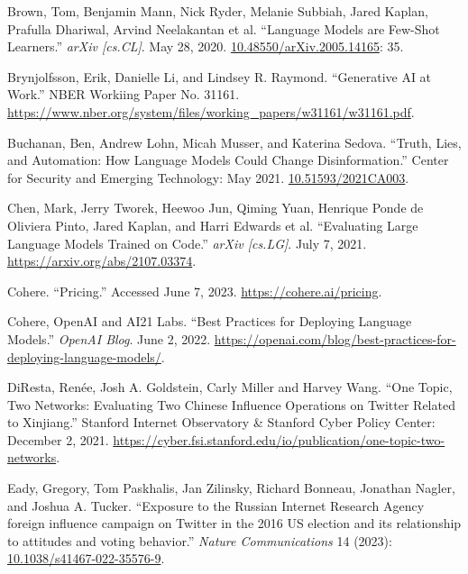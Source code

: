 \documentclass{article}
\begin{document}
\begin{thebibliography}{9}
  Brown, Tom, Benjamin Mann, Nick Ryder, Melanie Subbiah, Jared Kaplan, Prafulla Dhariwal, Arvind Neelakantan et al. ``Language Models are Few-Shot Learners.'' \textit{arXiv [cs.CL]}. May 28, 2020. \href{https://arxiv.org/abs/2005.14165}{10.48550/arXiv.2005.14165}: 35.

  Brynjolfsson, Erik, Danielle Li, and Lindsey R. Raymond. ``Generative AI at Work.'' NBER Workiing Paper No. 31161. \href{https://www.nber.org/system/files/working_papers/w31161/w31161.pdf}{https://www.nber.org/system/files/working\_papers/w31161/w31161.pdf}.

  Buchanan, Ben, Andrew Lohn, Micah Musser, and Katerina Sedova. ``Truth, Lies, and Automation: How Language Models Could Change Disinformation.'' Center for Security and Emerging Technology: May 2021. \href{https://cset.georgetown.edu/publication/truth-lies-and-automation/}{10.51593/2021CA003}.

  Chen, Mark, Jerry Tworek, Heewoo Jun, Qiming Yuan, Henrique Ponde de Oliviera Pinto, Jared Kaplan, and Harri Edwards et al. ``Evaluating Large Language Models Trained on Code.'' \textit{arXiv [cs.LG]}. July 7, 2021. \href{https://arxiv.org/abs/2107.03374}{https://arxiv.org/abs/2107.03374}.

  Cohere. ``Pricing.'' Accessed June 7, 2023. \href{https://cohere.ai/pricing}{https://cohere.ai/pricing}.

  Cohere, OpenAI and AI21 Labs. ``Best Practices for Deploying Language Models.'' \textit{OpenAI Blog}. June 2, 2022. \href{https://openai.com/blog/best-practices-for-deploying-language-models/}{https://openai.com/blog/best-practices-for-deploying-language-models/}.

  DiResta, Renée, Josh A. Goldstein, Carly Miller and Harvey Wang. ``One Topic, Two Networks: Evaluating Two Chinese Influence Operations on Twitter Related to Xinjiang.'' Stanford Internet Observatory \& Stanford Cyber Policy Center: December 2, 2021. \href{https://cyber.fsi.stanford.edu/io/publication/one-topic-two-networks}{https://cyber.fsi.stanford.edu/io/publication/one-topic-two-networks}.

  Eady, Gregory, Tom Paskhalis, Jan Zilinsky, Richard Bonneau, Jonathan Nagler, and Joshua A. Tucker. ``Exposure to the Russian Internet Research Agency foreign influence campaign on Twitter in the 2016 US election and its relationship to attitudes and voting behavior.'' \textit{Nature Communications} 14 (2023): \href{https://www.nature.com/articles/s41467-022-35576-9}{10.1038/s41467-022-35576-9}.


\end{thebibliography}
\end{document}

